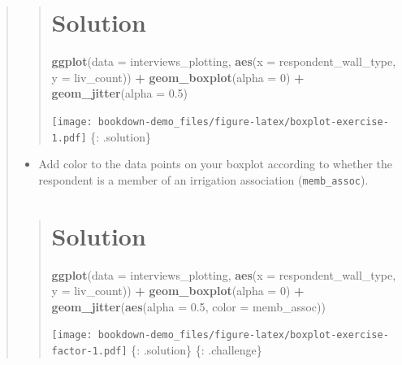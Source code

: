 \documentclass[]{book}
\newenvironment{Shaded}{\begin{snugshade}}{\end{snugshade}}
\newcommand{\KeywordTok}[1]{\textcolor[rgb]{0.13,0.29,0.53}{\textbf{#1}}}
\newcommand{\DataTypeTok}[1]{\textcolor[rgb]{0.13,0.29,0.53}{#1}}
\newcommand{\DecValTok}[1]{\textcolor[rgb]{0.00,0.00,0.81}{#1}}
\newcommand{\FloatTok}[1]{\textcolor[rgb]{0.00,0.00,0.81}{#1}}
\newcommand{\StringTok}[1]{\textcolor[rgb]{0.31,0.60,0.02}{#1}}
\newcommand{\OperatorTok}[1]{\textcolor[rgb]{0.81,0.36,0.00}{\textbf{#1}}}
\newcommand{\NormalTok}[1]{#1}
\providecommand{\tightlist}{%
  \setlength{\itemsep}{0pt}\setlength{\parskip}{0pt}}
\begin{document}
\begin{quote}
\begin{quote}
\section{Solution}\label{solution-18}

\begin{Shaded}
\begin{Highlighting}[]
\KeywordTok{ggplot}\NormalTok{(}\DataTypeTok{data =}\NormalTok{ interviews_plotting, }\KeywordTok{aes}\NormalTok{(}\DataTypeTok{x =}\NormalTok{ respondent_wall_type, }\DataTypeTok{y =}\NormalTok{ liv_count)) }\OperatorTok{+}
\StringTok{  }\KeywordTok{geom_boxplot}\NormalTok{(}\DataTypeTok{alpha =} \DecValTok{0}\NormalTok{) }\OperatorTok{+}
\StringTok{  }\KeywordTok{geom_jitter}\NormalTok{(}\DataTypeTok{alpha =} \FloatTok{0.5}\NormalTok{)}
\end{Highlighting}
\end{Shaded}

\texttt{[image: bookdown-demo\_files/figure-latex/boxplot-exercise-1.pdf]}
\{: .solution\}
\end{quote}

\begin{itemize}
\tightlist
\item
  Add color to the data points on your boxplot according to whether the
  respondent is a member of an irrigation association
  (\texttt{memb\_assoc}).
\end{itemize}

\begin{quote}
\section{Solution}\label{solution-19}

\begin{Shaded}
\begin{Highlighting}[]
\KeywordTok{ggplot}\NormalTok{(}\DataTypeTok{data =}\NormalTok{ interviews_plotting, }\KeywordTok{aes}\NormalTok{(}\DataTypeTok{x =}\NormalTok{ respondent_wall_type, }\DataTypeTok{y =}\NormalTok{ liv_count)) }\OperatorTok{+}
\StringTok{  }\KeywordTok{geom_boxplot}\NormalTok{(}\DataTypeTok{alpha =} \DecValTok{0}\NormalTok{) }\OperatorTok{+}
\StringTok{  }\KeywordTok{geom_jitter}\NormalTok{(}\KeywordTok{aes}\NormalTok{(}\DataTypeTok{alpha =} \FloatTok{0.5}\NormalTok{, }\DataTypeTok{color =}\NormalTok{ memb_assoc))}
\end{Highlighting}
\end{Shaded}

\texttt{[image: bookdown-demo\_files/figure-latex/boxplot-exercise-factor-1.pdf]}
\{: .solution\} \{: .challenge\}
\end{quote}
\end{quote}
\end{document}
